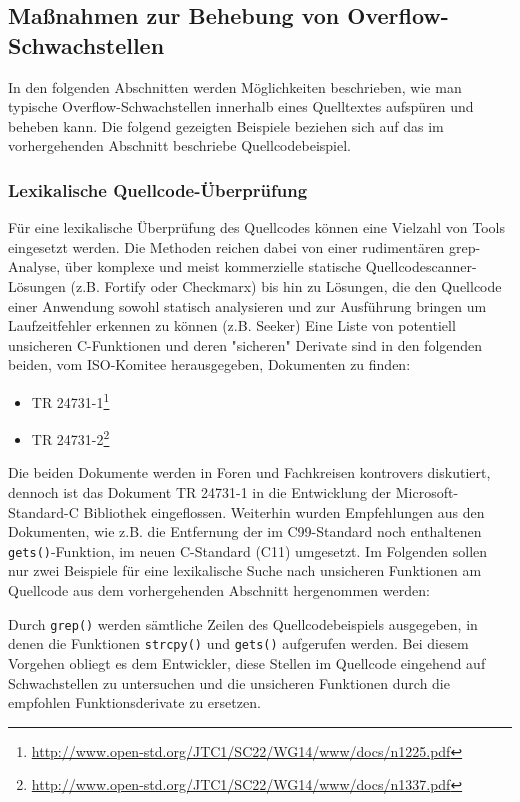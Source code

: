 \subsection{Maßnahmen zur Behebung von Overflow-Schwachstellen}

In den folgenden Abschnitten werden Möglichkeiten beschrieben, wie man 
typische Overflow-Schwachstellen innerhalb eines Quelltextes aufspüren 
und beheben kann. Die folgend gezeigten Beispiele beziehen sich auf das 
im vorhergehenden Abschnitt beschriebe Quellcodebeispiel.

\subsubsection{Lexikalische Quellcode-Überprüfung}

Für eine lexikalische Überprüfung des Quellcodes können eine Vielzahl 
von Tools eingesetzt werden. Die Methoden reichen dabei von einer 
rudimentären grep-Analyse, über komplexe und meist kommerzielle 
statische Quellcodescanner-Lösungen (z.B. Fortify oder Checkmarx) 
bis hin zu Lösungen, die den Quellcode einer Anwendung sowohl statisch 
analysieren und zur Ausführung bringen um Laufzeitfehler erkennen zu 
können (z.B. Seeker)
Eine Liste von potentiell unsicheren C-Funktionen und deren "sicheren" 
Derivate sind in den folgenden beiden, vom ISO-Komitee herausgegeben, 
Dokumenten zu finden:

\begin{itemize}
      \item TR 24731-1\footnote{\url{http://www.open-std.org/JTC1/SC22/WG14/www/docs/n1225.pdf}}   
      \item TR 24731-2\footnote{\url{http://www.open-std.org/JTC1/SC22/WG14/www/docs/n1337.pdf}}
\end{itemize}
	
Die beiden Dokumente werden in Foren und Fachkreisen kontrovers 
diskutiert, dennoch ist das Dokument TR 24731-1 in die Entwicklung 
der Microsoft-Standard-C Bibliothek eingeflossen. Weiterhin wurden 
Empfehlungen aus den Dokumenten, wie z.B. die Entfernung der im 
C99-Standard noch enthaltenen \texttt{gets()}-Funktion, im neuen 
C-Standard (C11) umgesetzt.
Im Folgenden sollen nur zwei Beispiele für eine lexikalische Suche 
nach unsicheren Funktionen am Quellcode aus dem vorhergehenden 
Abschnitt hergenommen werden:
\par\medskip 
Durch \texttt{grep()} werden sämtliche Zeilen des Quellcodebeispiels 
ausgegeben, in denen die Funktionen \texttt{strcpy()} und \texttt{gets()} 
aufgerufen werden. Bei diesem Vorgehen obliegt es dem Entwickler, diese 
Stellen im Quellcode eingehend auf Schwachstellen zu untersuchen und 
die unsicheren Funktionen durch die empfohlen Funktionsderivate zu 
ersetzen.

